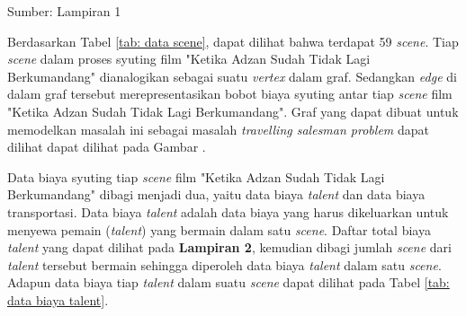 {    \vspace{-8mm}
    \begin{flushright}
        Sumber: Lampiran 1
    \end{flushright}

    Berdasarkan Tabel \ref{tab: data scene}, dapat dilihat bahwa terdapat 59 \textit{scene}.
    Tiap \textit{scene} dalam proses syuting film "Ketika Adzan Sudah Tidak Lagi Berkumandang" dianalogikan sebagai
    suatu \textit{vertex} dalam graf.
    Sedangkan \textit{edge} di dalam graf tersebut merepresentasikan bobot biaya syuting antar tiap \textit{scene} film "Ketika
    Adzan Sudah Tidak Lagi Berkumandang".
    Graf yang dapat dibuat untuk memodelkan masalah ini sebagai masalah \textit{travelling salesman problem} dapat dilihat
    dapat dilihat pada Gambar .

    Data biaya syuting tiap \textit{scene} film "Ketika Adzan Sudah Tidak Lagi Berkumandang" dibagi menjadi dua,
    yaitu data biaya \textit{talent} dan data biaya transportasi.
    Data biaya \textit{talent} adalah data biaya yang harus dikeluarkan untuk menyewa pemain (\textit{talent}) yang bermain dalam satu \textit{scene}.
    Daftar total biaya \textit{talent} yang dapat dilihat pada \textbf{Lampiran 2}, kemudian dibagi jumlah \textit{scene} dari \textit{talent} tersebut bermain sehingga
    diperoleh data biaya \textit{talent} dalam satu \textit{scene}.
    Adapun data biaya tiap \textit{talent} dalam suatu \textit{scene} dapat dilihat pada Tabel \ref{tab: data biaya talent}.

}
